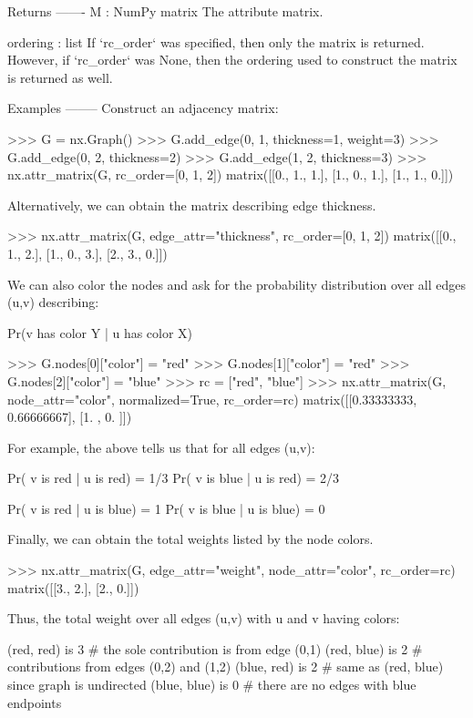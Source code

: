 \begin{DoxyVerb}
Returns
-------
M : NumPy matrix
    The attribute matrix.

ordering : list
    If `rc_order` was specified, then only the matrix is returned.
    However, if `rc_order` was None, then the ordering used to construct
    the matrix is returned as well.

Examples
--------
Construct an adjacency matrix:

>>> G = nx.Graph()
>>> G.add_edge(0, 1, thickness=1, weight=3)
>>> G.add_edge(0, 2, thickness=2)
>>> G.add_edge(1, 2, thickness=3)
>>> nx.attr_matrix(G, rc_order=[0, 1, 2])
matrix([[0., 1., 1.],
        [1., 0., 1.],
        [1., 1., 0.]])

Alternatively, we can obtain the matrix describing edge thickness.

>>> nx.attr_matrix(G, edge_attr="thickness", rc_order=[0, 1, 2])
matrix([[0., 1., 2.],
        [1., 0., 3.],
        [2., 3., 0.]])

We can also color the nodes and ask for the probability distribution over
all edges (u,v) describing:

    Pr(v has color Y | u has color X)

>>> G.nodes[0]["color"] = "red"
>>> G.nodes[1]["color"] = "red"
>>> G.nodes[2]["color"] = "blue"
>>> rc = ["red", "blue"]
>>> nx.attr_matrix(G, node_attr="color", normalized=True, rc_order=rc)
matrix([[0.33333333, 0.66666667],
        [1.        , 0.        ]])

For example, the above tells us that for all edges (u,v):

    Pr( v is red  | u is red)  = 1/3
    Pr( v is blue | u is red)  = 2/3

    Pr( v is red  | u is blue) = 1
    Pr( v is blue | u is blue) = 0

Finally, we can obtain the total weights listed by the node colors.

>>> nx.attr_matrix(G, edge_attr="weight", node_attr="color", rc_order=rc)
matrix([[3., 2.],
        [2., 0.]])

Thus, the total weight over all edges (u,v) with u and v having colors:

    (red, red)   is 3   # the sole contribution is from edge (0,1)
    (red, blue)  is 2   # contributions from edges (0,2) and (1,2)
    (blue, red)  is 2   # same as (red, blue) since graph is undirected
    (blue, blue) is 0   # there are no edges with blue endpoints\end{DoxyVerb}
 \mbox{\label{namespacenetworkx_1_1linalg_1_1attrmatrix_aad30696466f0e0e645fe36412a9bd171}} 
